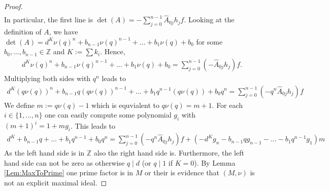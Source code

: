 \documentclass[10pt,a4paper]{article}
\theoremstyle{definition}
\newcommand{\ZZ}{\mathbb{Z}}
\begin{document}
\begin{proof}
\begin{align*}
\end{align*}
In particular, the first line is $\det(A) = -\sum_{j=0}^{n-1}\hat{A}_{0j}h_jf$. Looking at the definition of $A$, we have $\det(A) = d^K\nu(q)^n+b_{n-1}\nu(q)^{n-1}+\dots+b_1\nu(q)+b_0$ for some $b_0,\dots,b_{n-1}\in \ZZ$ and $K:= \sum k_i$. Hence, 
\begin{align*}
d^K\nu(q)^n+b_{n-1}\nu(q)^{n-1}+\dots+b_1\nu(q)+b_0 = \sum_{j=0}^{n-1}(-\hat{A}_{0j}h_j)f.
\end{align*}
Multiplying both sides with $q^n$ leads to 
\begin{align*}
d^K(q\nu(q))^n+b_{n-1}q(q\nu(q))^{n-1}+\dots+b_1q^{n-1}(q\nu(q))+b_0q^n = \sum_{j=0}^{n-1}(-q^n\hat{A}_{0j}h_j)f
\end{align*}
We define $m:= q\nu(q)-1$ which is equvialent to $q\nu(q)= m+1$. For each $i\in \{1,\dots,n\}$ one can easily compute some polynomial $g_i$ with $(m+1)^i = 1+mg_i$. This leads to
\begin{align*}
d^K+b_{n-1}q+\dots+b_1q^{n-1}+b_0q^n =
 \sum_{j=0}^{n-1}(-q^n\hat{A}_{0j}h_j)f + (-d^Kg_n-b_{n-1}qg_{n-1}-\dots-b_1q^{n-1}g_1)m
\end{align*}
As the left hand side is in $\ZZ$ also the right hand side is. Furthermore, the left hand side can not be zero as otherwise $q\mid d$ (or $q\mid 1$ if $K=0$). By Lemma \ref{Lem:MaxToPrime} one prime factor is in $M$ or their is evidence that $(M,\nu)$ is not an explicit maximal ideal.
\end{proof}

{}
\end{document}
